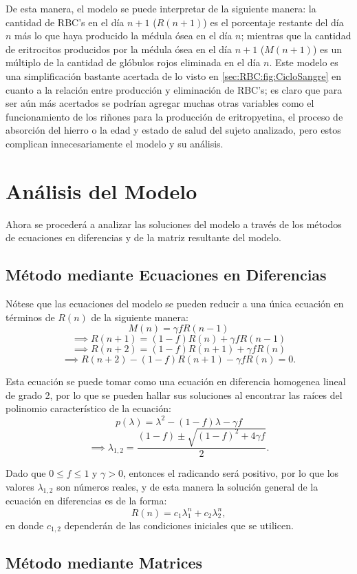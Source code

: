 De esta manera, el modelo se puede interpretar de la siguiente manera: la cantidad de RBC's en el día $n+1$ ($R(n+1)$) es el porcentaje restante del día $n$ más lo que haya producido la médula ósea en el día $n$; mientras que la cantidad de eritrocitos producidos por la médula ósea en el día $n+1$ ($M(n+1)$) es un múltiplo de la cantidad de glóbulos rojos eliminada en el día $n$. Este modelo es una simplificación bastante acertada de lo visto en \ref{sec:RBC:fig:CicloSangre} en cuanto a la relación entre producción y eliminación de RBC's; es claro que para ser aún más acertados se podrían agregar muchas otras variables como el funcionamiento de los riñones para la producción de eritropyetina, el proceso de absorción del hierro o la edad y estado de salud del sujeto analizado, pero estos complican innecesariamente el modelo y su análisis.

\section{Análisis del Modelo}\label{sec:modelo:analisis}
Ahora se procederá a analizar las soluciones del modelo a través de los métodos de ecuaciones en diferencias y de la matriz resultante del modelo.
\subsection{Método mediante Ecuaciones en Diferencias}

Nótese que las ecuaciones del modelo se pueden reducir a una única ecuación en términos de $R(n)$ de la siguiente manera:
$$M(n)=\gamma f R(n-1)$$
$$\implies R(n+1)=(1-f)R(n)+\gamma f R(n-1)$$
$$\implies R(n+2)=(1-f)R(n+1)+\gamma f R(n)$$
$$\implies R(n+2)-(1-f)R(n+1)-\gamma f R(n)=0.$$

Esta ecuación se puede tomar como una ecuación en diferencia homogenea lineal de grado 2, por lo que se pueden hallar sus soluciones al encontrar las raíces del polinomio característico de la ecuación:
$$p(\lambda)=\lambda^2-(1-f)\lambda-\gamma f$$
$$\implies \lambda_{1,2}=\dfrac{(1-f)\pm\sqrt{(1-f)^2+4\gamma f}}{2}.$$

Dado que $0\leq f \leq 1$ y $\gamma > 0$, entonces el radicando será positivo, por lo que los valores $\lambda_{1,2}$ son números reales, y de esta manera la solución general de la ecuación en diferencias es de la forma:
$$R(n)=c_1 \lambda_1^n+ c_2 \lambda_2^n,$$
en donde $c_{1,2}$ dependerán de las condiciones iniciales que se utilicen.

\subsection{Método mediante Matrices}

